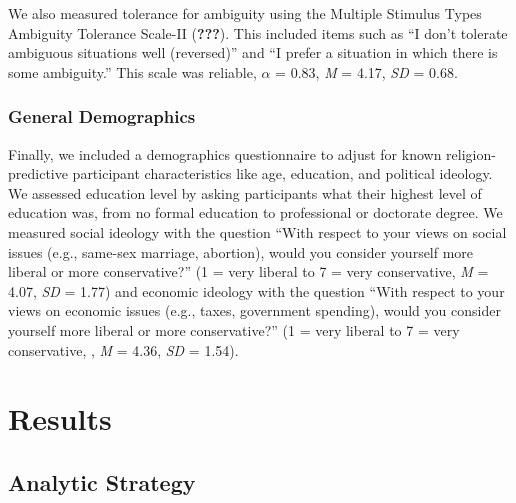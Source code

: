 \documentclass[english,man,mask]{article}
\begin{document}
We also measured tolerance for ambiguity using the Multiple Stimulus Types Ambiguity Tolerance Scale-II ({\textbf{???}}). This included items such as \enquote{I don't tolerate ambiguous situations well (reversed)} and \enquote{I prefer a situation in which there is some ambiguity.} This scale was reliable, \(\alpha\) = 0.83, \emph{M} = 4.17, \emph{SD} = 0.68.

\hypertarget{general-demographics}{%
\subsubsection{General Demographics}\label{general-demographics}}

Finally, we included a demographics questionnaire to adjust for known religion-predictive participant characteristics like age, education, and political ideology. We assessed education level by asking participants what their highest level of education was, from no formal education to professional or doctorate degree. We measured social ideology with the question \enquote{With respect to your views on social issues (e.g., same-sex marriage, abortion), would you consider yourself more liberal or more conservative?} (1 = very liberal to 7 = very conservative, \emph{M} = 4.07, \emph{SD} = 1.77) and economic ideology with the question \enquote{With respect to your views on economic issues (e.g., taxes, government spending), would you consider yourself more liberal or more conservative?} (1 = very liberal to 7 = very conservative, , \emph{M} = 4.36, \emph{SD} = 1.54).

\hypertarget{results}{%
\section{Results}\label{results}}

\hypertarget{analytic-strategy}{%
\subsection{Analytic Strategy}\label{analytic-strategy}}
\end{document}
